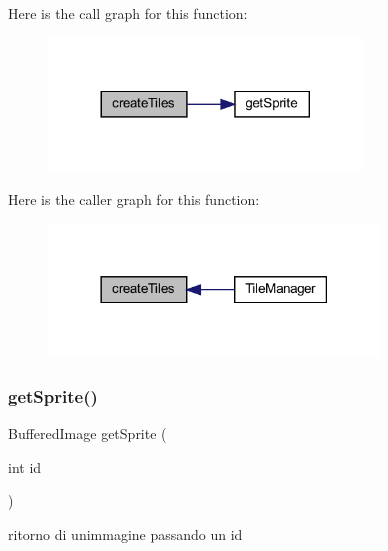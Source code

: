 Here is the call graph for this function\+:
\nopagebreak
\begin{figure}[H]
\begin{center}
\leavevmode
\includegraphics[width=236pt]{classmanagers_1_1_tile_manager_abb7fa074b36e6e355db16761115fb367_cgraph}
\end{center}
\end{figure}
Here is the caller graph for this function\+:
\nopagebreak
\begin{figure}[H]
\begin{center}
\leavevmode
\includegraphics[width=249pt]{classmanagers_1_1_tile_manager_abb7fa074b36e6e355db16761115fb367_icgraph}
\end{center}
\end{figure}
\mbox{\label{classmanagers_1_1_tile_manager_a46ebd32c7ec4ac506010fe465687bdd7}} 
\subsubsection{\texorpdfstring{get\+Sprite()}{getSprite()}\hspace{0.1cm}{\footnotesize\ttfamily [1/2]}}
{\footnotesize\ttfamily Buffered\+Image get\+Sprite (\begin{DoxyParamCaption}\item[{int}]{id }\end{DoxyParamCaption})}



ritorno di un\textquotesingle{}immagine passando un id 


